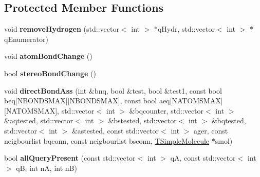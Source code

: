 \subsection*{Protected Member Functions}
\begin{DoxyCompactItemize}
\item 
\hypertarget{class_open_babel_1_1_t_edited_molecule_a3cd585790a800e8746eb525c41e4c67c}{void {\bfseries remove\-Hydrogen} (std\-::vector$<$ int $>$ $\ast$q\-Hydr, std\-::vector$<$ int $>$ $\ast$q\-Enumerator)}\label{class_open_babel_1_1_t_edited_molecule_a3cd585790a800e8746eb525c41e4c67c}

\item 
\hypertarget{class_open_babel_1_1_t_edited_molecule_ab0ce9e886298dedbfaa8562a87e90299}{void {\bfseries atom\-Bond\-Change} ()}\label{class_open_babel_1_1_t_edited_molecule_ab0ce9e886298dedbfaa8562a87e90299}

\item 
\hypertarget{class_open_babel_1_1_t_edited_molecule_a059984c0eef9c0053fb2b038cf20e3ec}{bool {\bfseries stereo\-Bond\-Change} ()}\label{class_open_babel_1_1_t_edited_molecule_a059984c0eef9c0053fb2b038cf20e3ec}

\item 
\hypertarget{class_open_babel_1_1_t_edited_molecule_a00a5bdd0ec4ec46335cf41d75efcdd42}{void {\bfseries direct\-Bond\-Ass} (int \&bnq, bool \&test, bool \&test1, const bool beq\mbox{[}N\-B\-O\-N\-D\-S\-M\-A\-X\mbox{]}\mbox{[}N\-B\-O\-N\-D\-S\-M\-A\-X\mbox{]}, const bool aeq\mbox{[}N\-A\-T\-O\-M\-S\-M\-A\-X\mbox{]}\mbox{[}N\-A\-T\-O\-M\-S\-M\-A\-X\mbox{]}, std\-::vector$<$ int $>$ \&bqcounter, std\-::vector$<$ int $>$ \&aqtested, std\-::vector$<$ int $>$ \&bstested, std\-::vector$<$ int $>$ \&bqtested, std\-::vector$<$ int $>$ \&astested, const std\-::vector$<$ int $>$ ager, const neigbourlist bqconn, const neigbourlist bsconn, \hyperlink{class_open_babel_1_1_t_simple_molecule}{T\-Simple\-Molecule} $\ast$smol)}\label{class_open_babel_1_1_t_edited_molecule_a00a5bdd0ec4ec46335cf41d75efcdd42}

\item 
\hypertarget{class_open_babel_1_1_t_edited_molecule_a6a2a1940a9b03a611f5e244b5fc20c74}{bool {\bfseries all\-Query\-Present} (const std\-::vector$<$ int $>$ q\-A, const std\-::vector$<$ int $>$ q\-B, int n\-A, int n\-B)}\label{class_open_babel_1_1_t_edited_molecule_a6a2a1940a9b03a611f5e244b5fc20c74}

\end{DoxyCompactItemize}
